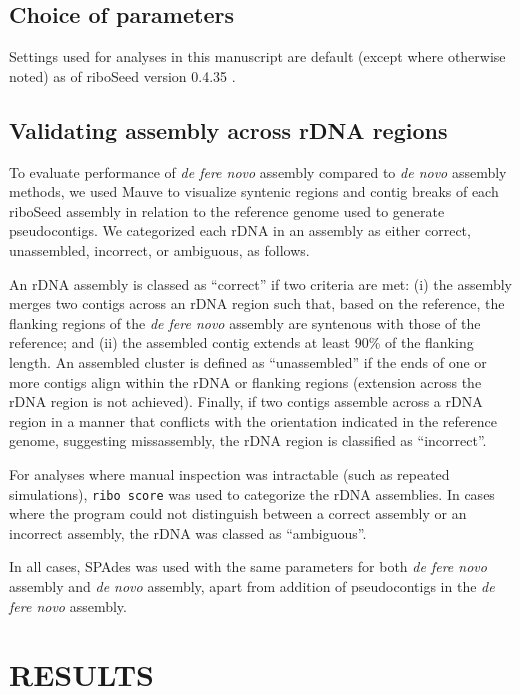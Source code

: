 \documentclass[a4,center,fleqn]{NAR}
\begin{document}
\subsection*{Choice of parameters}
Settings used for analyses in this manuscript are default (except where otherwise noted) as of riboSeed version 0.4.35 \cite{nicholas_r_waters_2017_1037965}.


\subsection*{Validating assembly across rDNA regions}

To evaluate performance of \textit{de fere novo} assembly compared to \textit{de novo} assembly methods, we used Mauve to visualize syntenic regions and contig breaks of each riboSeed assembly in relation to the reference genome used to generate pseudocontigs. We categorized each rDNA in an assembly as either correct, unassembled, incorrect, or ambiguous, as follows.

An rDNA assembly is classed as ``correct'' if two criteria are met: (i) the assembly merges two contigs across an rDNA region such that, based on the reference, the flanking regions of the \textit{de fere novo} assembly are syntenous with those of the reference; and (ii) the assembled contig extends at least 90\% of the flanking length. An assembled cluster is defined as ``unassembled'' if the ends of one or more contigs align within the rDNA or flanking regions (extension across the rDNA region is not achieved). Finally, if two contigs assemble across a rDNA region in a manner that conflicts with the orientation indicated in the reference genome, suggesting missassembly, the rDNA region is classified as ``incorrect''.

For analyses where manual inspection was intractable (such as repeated simulations), \texttt{ribo score} was used to categorize the rDNA assemblies. In cases where the program could not distinguish between a correct assembly or an incorrect assembly, the rDNA was classed as ``ambiguous''.

In all cases, SPAdes was used with the same parameters for both \textit{de fere novo} assembly and \textit{de novo} assembly, apart from addition of pseudocontigs in the \textit{de fere novo} assembly.

\section{RESULTS}
\end{document}
